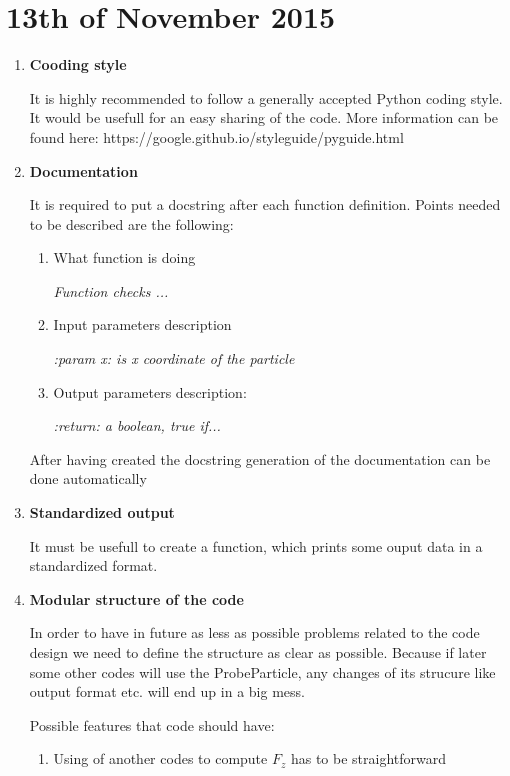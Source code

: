 \section{13th of November 2015}

\begin{enumerate}
    \item \textbf{Cooding style}

    It is highly recommended to follow a generally accepted Python coding style.
    It would be usefull for an easy sharing of the code. More information can be found
    here: https://google.github.io/styleguide/pyguide.html

    \item \textbf{Documentation}

    It is required to put a docstring after each function definition. Points
    needed to be described are the following:
    \begin{enumerate}
        \item What function is doing

        \textit{Function checks ...}

        \item Input parameters description

        \textit{:param x: is x coordinate of the particle}

        \item Output parameters description:

        \textit{ :return: a boolean, true if...}
    \end{enumerate}

    After having created the docstring generation of the documentation can be done automatically

    \item \textbf{Standardized output}

    It must be usefull to create a function, which prints some ouput data in a
    standardized format.

    \item \textbf{Modular structure of the code}

    In order to have in future as less as possible problems related to the code
    design we need to define the structure as clear as possible. Because if later some other
    codes will use the  ProbeParticle, any changes of its strucure like
    output format etc. will end up in a big mess.

    Possible features that code should have:
        \begin{enumerate}
            \item Using of another codes to compute $F_z$ has to be
            straightforward


\end{enumerate}
\end{enumerate}
